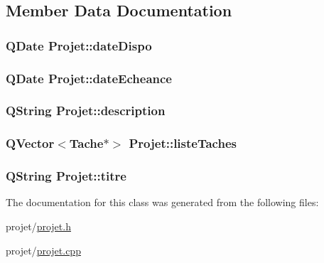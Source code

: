 \subsection{Member Data Documentation}
\hypertarget{class_projet_a8a89803d629bb571062921008e6a2639}{}
\subsubsection[{date\+Dispo}]{\setlength{\rightskip}{0pt plus 5cm}Q\+Date Projet\+::date\+Dispo\hspace{0.3cm}{\ttfamily [private]}}\label{class_projet_a8a89803d629bb571062921008e6a2639}
\hypertarget{class_projet_a868ee370bb8f071b830dda61f55d99cd}{}
\subsubsection[{date\+Echeance}]{\setlength{\rightskip}{0pt plus 5cm}Q\+Date Projet\+::date\+Echeance\hspace{0.3cm}{\ttfamily [private]}}\label{class_projet_a868ee370bb8f071b830dda61f55d99cd}
\hypertarget{class_projet_ac2e3a37d5f0201390991b97f258ce0eb}{}
\subsubsection[{description}]{\setlength{\rightskip}{0pt plus 5cm}Q\+String Projet\+::description\hspace{0.3cm}{\ttfamily [private]}}\label{class_projet_ac2e3a37d5f0201390991b97f258ce0eb}
\hypertarget{class_projet_a268bc6fc9be6d5e266439cc6371cd617}{}
\subsubsection[{liste\+Taches}]{\setlength{\rightskip}{0pt plus 5cm}Q\+Vector$<${\bf Tache}$\ast$$>$ Projet\+::liste\+Taches\hspace{0.3cm}{\ttfamily [private]}}\label{class_projet_a268bc6fc9be6d5e266439cc6371cd617}
\hypertarget{class_projet_a9759849c856c2ac63f94751b876fd289}{}
\subsubsection[{titre}]{\setlength{\rightskip}{0pt plus 5cm}Q\+String Projet\+::titre\hspace{0.3cm}{\ttfamily [private]}}\label{class_projet_a9759849c856c2ac63f94751b876fd289}


The documentation for this class was generated from the following files\+:\begin{DoxyCompactItemize}
\item 
projet/\hyperlink{projet_8h}{projet.\+h}\item 
projet/\hyperlink{projet_8cpp}{projet.\+cpp}\end{DoxyCompactItemize}
